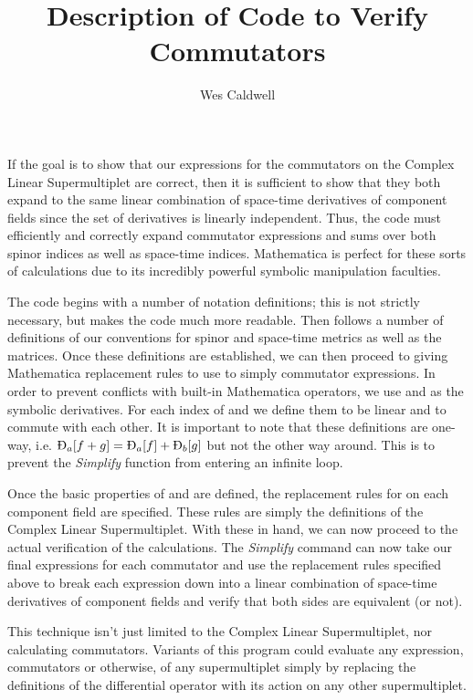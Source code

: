 \documentclass[a4paper]{article}
\title{Description of Code to Verify Commutators}
\author{Wes Caldwell}
\begin{document}
\maketitle

If the goal is to show that our expressions for the commutators on the Complex Linear Supermultiplet are correct, then it is sufficient to show that they both expand to the same linear combination of space-time derivatives of component fields since the set of derivatives is linearly independent. Thus, the code must efficiently and correctly expand commutator expressions and sums over both spinor indices as well as space-time indices. Mathematica is perfect for these sorts of calculations due to its incredibly powerful symbolic manipulation faculties.

The code begins with a number of notation definitions; this is not strictly necessary, but makes the code much more readable. Then follows a number of definitions of our conventions for spinor and space-time metrics as well as the \gamma{} matrices. Once these definitions are established, we can then proceed to giving Mathematica replacement rules to use to simply commutator expressions. In order to prevent conflicts with built-in Mathematica operators, we use \dh{} and \DH{} as the symbolic derivatives. For each index of \dh{} and \DH{} we define them to be linear and to commute with each other. It is important to note that these definitions are one-way, i.e. $\text{\DH}_a[f+g]=\text{\DH}_a[f]+\text{\DH}_b[g]$ but not the other way around. This is to prevent the \textit{Simplify} function from entering an infinite loop.

Once the basic properties of \dh{} and \DH{} are defined, the replacement rules for \DH{} on each component field are specified. These rules are simply the definitions of the Complex Linear Supermultiplet. With these in hand, we can now proceed to the actual verification of the calculations. The \textit{Simplify} command can now take our final expressions for each commutator and use the replacement rules specified above to break each expression down into a linear combination of space-time derivatives of component fields and verify that both sides are equivalent (or not).

This technique isn't just limited to the Complex Linear Supermultiplet, nor calculating commutators. Variants of this program could evaluate any expression, commutators or otherwise, of any supermultiplet simply by replacing the definitions of the differential operator \DH{} with its action on any other supermultiplet.
\end{document}
